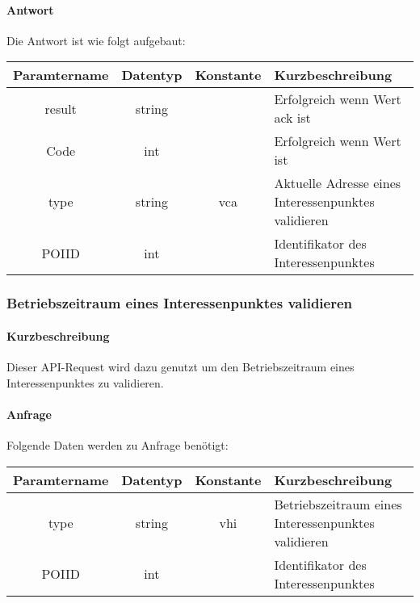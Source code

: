 \paragraph{Antwort}Die Antwort ist wie folgt aufgebaut:
\begin{table}[H]
	\begin{tabular}{|c|c|c|p{6.5cm}|}
		\hline
		\textbf{Paramtername} & \textbf{Datentyp} & \textbf{Konstante} & \textbf{Kurzbeschreibung}                                                                                               \\ \hline
		result              & string           &                 & Erfolgreich wenn Wert {\glqq ack\grqq} ist \\ \hline
		Code                & int              &                 & Erfolgreich wenn Wert {\glqq 0\grqq} ist \\ \hline
		type                & string           & vca             & Aktuelle Adresse eines Interessenpunktes validieren \\ \hline
		POIID               & int              &                 & Identifikator des Interessenpunktes \\ \hline
	\end{tabular}
\end{table}
\subsubsection{Betriebszeitraum eines Interessenpunktes validieren}
\paragraph{Kurzbeschreibung}Dieser API-Request wird dazu genutzt um den Betriebszeitraum eines Interessenpunktes zu validieren.
\paragraph{Anfrage}Folgende Daten werden zu Anfrage benötigt:
\begin{table}[H]
	\begin{tabular}{|c|c|c|p{6.5cm}|}
		\hline
		\textbf{Paramtername} & \textbf{Datentyp} & \textbf{Konstante} & \textbf{Kurzbeschreibung}                                                                                               \\ \hline
		type                & string            & vhi                & Betriebszeitraum eines Interessenpunktes validieren \\ \hline
		POIID               & int               &                    & Identifikator des Interessenpunktes \\ \hline
	\end{tabular}
\end{table}
